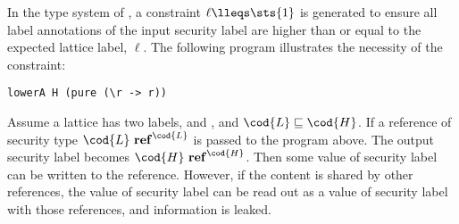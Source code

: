 In the type system of , a constraint $\ell\lleqs \sts{1}$ is generated to ensure all label 
annotations of the input security label are higher than or equal to the expected lattice label, $\ell$.
The following program illustrates the necessity of the constraint:
\begin{verbatim}
lowerA H (pure (\r -> r))
\end{verbatim}
Assume a lattice has two labels,  and , and $\cod{L}\sqsubseteq \cod{H}$. If a reference 
of security type $\cod{L}~\mathbf{ref}^{\cod{L}}$ is passed to the program above. The output 
security label becomes $\cod{H}~\mathbf{ref}^{\cod{H}}$. Then some value of security label  can
be written to the reference. However, if the content is shared by other references, the value of 
security label  can be read out as a value of security label  with those references, and
information is leaked.


